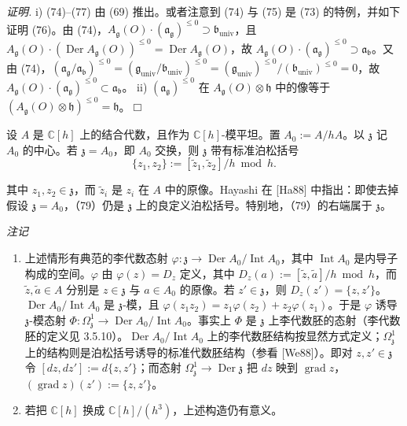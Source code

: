 \emph{证明.} i) (74)–(77) 由 (69) 推出。或者注意到 (74) 与 (75) 是 (73) 的特例，并如下证明 (76)。由 (74)，$A_{\mathfrak{g}}(O)\cdot(\mathfrak{a}_{\mathfrak{g}})^{\le0}\supset\mathfrak{b}_{\mathrm{univ}}$，且 $A_{\mathfrak{g}}(O)\cdot(\operatorname{Der}A_{\mathfrak{g}}(O))^{\le0}=\operatorname{Der}A_{\mathfrak{g}}(O)$，故 $A_{\mathfrak{g}}(O)\cdot(\mathfrak{a}_{\mathfrak{g}})^{\le0}\supset\mathfrak{a}_{\mathfrak{b}}$。又由 (74)，$(\mathfrak{a}_{\mathfrak{g}}/\mathfrak{a}_{\mathfrak{b}})^{\le0}=(\mathfrak{g}_{\mathrm{univ}}/\mathfrak{b}_{\mathrm{univ}})^{\le0}=(\mathfrak{g}_{\mathrm{univ}})^{\le0}/(\mathfrak{b}_{\mathrm{univ}})^{\le0}=0$，故 $A_{\mathfrak{g}}(O)\cdot(\mathfrak{a}_{\mathfrak{g}})^{\le0}\subset\mathfrak{a}_{\mathfrak{b}}$。
ii) $(\mathfrak{a}_{\mathfrak{g}})^{\le0}$ 在 $A_{\mathfrak{g}}(O)\otimes\mathfrak{h}$ 中的像等于 $(A_{\mathfrak{g}}(O)\otimes\mathfrak{h})^{\le0}=\mathfrak{h}$。\hfill$\Box$

 设 $A$ 是 $\mathbb{C}[h]$ 上的结合代数，且作为 $\mathbb{C}[h]$-模平坦。置 $A_{0}:=A/hA$。以 $\mathfrak{z}$ 记 $A_{0}$ 的中心。若 $\mathfrak{z}=A_{0}$，即 $A_{0}$ 交换，则 $\mathfrak{z}$ 带有标准泊松括号
\begin{equation}\tag{79}
\{z_{1},z_{2}\}:=[\tilde z_{1},\tilde z_{2}]/h\bmod h.
\end{equation}


其中 $z_{1}, z_{2} \in \mathfrak{z}$，而 $\tilde{z}_{i}$ 是 $z_{i}$ 在 $A$ 中的原像。Hayashi 在 [Ha88] 中指出：即使去掉假设 $\mathfrak{z} = A_{0}$，（79）仍是 $\mathfrak{z}$ 上的良定义泊松括号。特别地，（79）的右端属于 $\mathfrak{z}$。

\emph{注记}
\begin{enumerate}[label=(\roman*),leftmargin=2.2em]
  \item 上述情形有典范的李代数态射 $\varphi: \mathfrak{z} \to \operatorname{Der} A_{0}/\operatorname{Int} A_{0}$，其中 $\operatorname{Int} A_{0}$ 是内导子构成的空间。$\varphi$ 由 $\varphi(z) = D_{z}$ 定义，其中 $D_{z}(a) := [\tilde{z}, \tilde{a}]/h \bmod h$，而 $\tilde{z}, \tilde{a} \in A$ 分别是 $z \in \mathfrak{z}$ 与 $a \in A_{0}$ 的原像。若 $z' \in \mathfrak{z}$，则 $D_{z}(z') = \{z, z'\}$。$\operatorname{Der} A_{0}/\operatorname{Int} A_{0}$ 是 $\mathfrak{z}$-模，且 $\varphi(z_{1}z_{2}) = z_{1}\varphi(z_{2}) + z_{2}\varphi(z_{1})$。于是 $\varphi$ 诱导 $\mathfrak{z}$-模态射 $\Phi: \Omega^{1}_{\mathfrak{z}} \to \operatorname{Der} A_{0}/\operatorname{Int} A_{0}$。事实上 $\Phi$ 是 $\mathfrak{z}$ 上李代数胚的态射（李代数胚的定义见 3.5.10）。$\operatorname{Der} A_{0}/\operatorname{Int} A_{0}$ 上的李代数胚结构按显然方式定义；$\Omega^{1}_{\mathfrak{z}}$ 上的结构则是泊松括号诱导的标准代数胚结构（参看 [We88]）。即对 $z, z' \in \mathfrak{z}$ 令 $[dz, dz'] := d\{z, z'\}$；而态射 $\Omega^{1}_{\mathfrak{z}} \to \operatorname{Der} \mathfrak{z}$ 把 $dz$ 映到 $\operatorname{grad} z$，$(\operatorname{grad} z)(z') := \{z, z'\}$。
  \item 若把 $\mathbb{C}[h]$ 换成 $\mathbb{C}[h]/(h^{3})$，上述构造仍有意义。
\end{enumerate}

